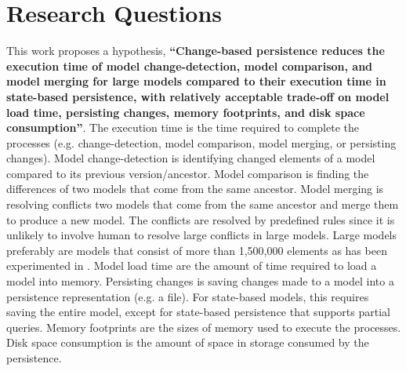 \documentclass[12pt, a4paper]{report} \usepackage[titletoc]{appendix}
\begin{document}

\section{Research Questions}
\label{sec:research_questions}
This work proposes a hypothesis, \textbf{``Change-based persistence reduces the execution time of model change-detection, model comparison, and model merging for large models compared to their execution time in state-based persistence, with relatively acceptable trade-off on model load time, persisting changes, memory footprints, and disk space consumption''}. The execution time is the time required to complete the processes (e.g. change-detection, model comparison, model merging, or persisting changes). Model change-detection is identifying changed elements of a model compared to its previous version/ancestor. Model comparison is finding the differences of two models that come from the same ancestor. Model merging is resolving conflicts two models that come from the same ancestor and merge them to produce a new model. The conflicts are resolved by predefined rules since it is unlikely to involve human to resolve large conflicts in large models. Large models preferably are models that consist of more than 1,500,000 elements as has been experimented in \cite{daniel2016neoemf,pagan2011morsa}. Model load time are the amount of time required to load a model into memory. Persisting changes is saving changes made to a model into a persistence representation (e.g. a file). For state-based models, this requires saving the entire model, except for state-based persistence that supports partial queries. Memory footprints are the sizes of memory used to execute the processes. Disk space consumption is the amount of space in storage consumed by the persistence.  
\end{document}
